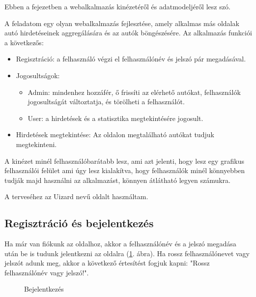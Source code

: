 Ebben a fejezetben a webalkalmazás kinézetéről és adatmodeljéről lesz szó.



A feladatom egy olyan webalkalmazás fejlesztése, amely alkalmas más oldalak autó hirdetéseinek aggregálására és az autók böngészésére. Az alkalmazás funkciói a következős:

\begin{itemize}
\item Regisztráció: a felhasználó végzi el felhasználónév és jelszó pár megadásával.
\item Jogosultságok:
	\begin{itemize}
	\item Admin: mindenhez hozzáfér, ő frissíti az elérhető autókat, felhasználók jogosultságát változtatja, és törölheti a felhasználót.
	\item User: a hirdetések és a statisztika megtekintésére jogosult.
	\end{itemize}
\item Hirdetések megtekintése: Az oldalon megtalálható autókat tudjuk megtekinteni.
\end{itemize}


A kinézet minél felhasználóbarátabb lesz, ami azt jelenti, hogy lesz egy grafikus felhasználói felület ami úgy lesz kialakítva, hogy felhasználók minél könnyebben tudják majd használni az alkalmazást, könnyen átlátható legyen számukra.

A terveséhez az Uizard \cite{uizard} nevű oldalt használtam.

\subsection{Regisztráció és bejelentkezés}

Ha már van fiókunk az oldalhoz, akkor a felhasználónév és a jelszó megadása után be is tudunk jelentkezni az oldalra (\ref{fig:Bejelentkezés}. ábra). Ha rossz felhasználónevet vagy jelszót adunk meg, akkor a következő értesítést fogjuk kapni: "Rossz felhasználónév vagy jelszó!".

\newpage

\begin{figure}[h]
\centering
{}
\caption{Bejelentkezés}
\label{fig:Bejelentkezés}
\end{figure}

